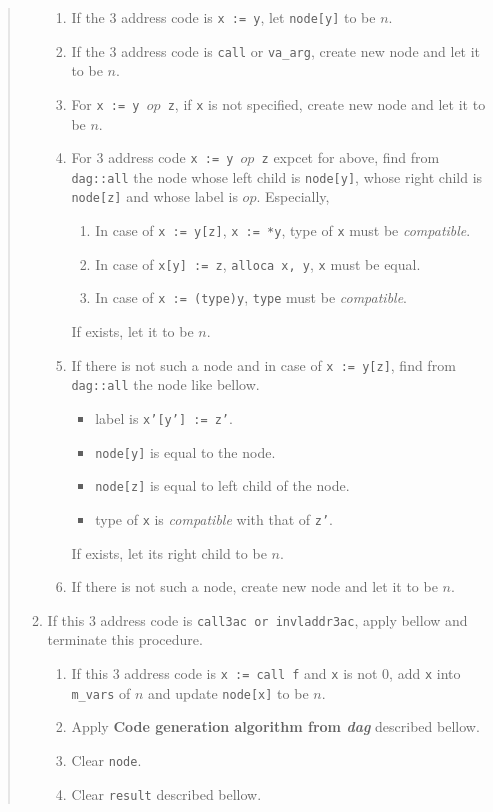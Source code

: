 \begin{quote}
\begin{enumerate}
\begin{enumerate}
\item If the 3 address code is {\tt{x := y}},
      let {\tt{node[y]}} to be $n$.
\item If the 3 address code is {\tt{call}} or {\tt{va\_arg}},
      create new node and let it to be $n$.
\item For {\tt{x := y $op$ z}}, if {\tt{x}} is not specified,
      create new node and let it to be $n$.
\item For 3 address code {\tt{x := y $op$ z}} expcet for above,
      find from {\tt{dag::all}} the node 
      whose left child is {\tt{node[y]}},
      whose right child is {\tt{node[z]}}
      and
      whose label is $op$. Especially,
\begin{enumerate}
\item In case of {\tt{x := y[z]}}, {\tt{x := *y}},
      type of {\tt{x}} must be {\it
      compatible}.
\item In case of {\tt{x[y] := z}}, {\tt{alloca x, y}},
      {\tt{x}} must be equal.
\item In case of {\tt{x := (type)y}}, {\tt{type}} must be
     {\it compatible}.
\end{enumerate}
      If exists, let it to be $n$.
\item \label{optimize_e109}
      If there is not such a node and in case of {\tt{x := y[z]}},
      find from {\tt{dag::all}} the node like bellow.
      \begin{itemize}
      \item label is {\tt{x'[y'] := z'}}.
      \item {\tt{node[y]}} is equal to the node.
      \item {\tt{node[z]}} is equal to left child of the node.
      \item type of {\tt{x}} is {\it compatible} with that of {\tt{z'}}.
      \end{itemize}
      If exists, let its right child to be $n$.
\item If there is not such a node, create new node and let it to be $n$.
\end{enumerate}
\item \label{optimize_e112}
      If this 3 address code is {\tt{call3ac} or {\tt{invladdr3ac}}},
      apply bellow and terminate this procedure.
      \begin{enumerate}
      \item If this 3 address code is {\tt{x := call f}} and {\tt{x}} 
            is not 0, add {\tt{x}} into {\tt{m\_vars}} of $n$ and
            update {\tt{node[x]}} to be $n$. 
      \item Apply {\bf Code generation algorithm from {\em dag}}
	    described bellow.
      \item Clear {\tt{node}}.
      \item Clear {\tt{result}} described bellow.
      \end{enumerate}


\end{enumerate}
\end{quote}
